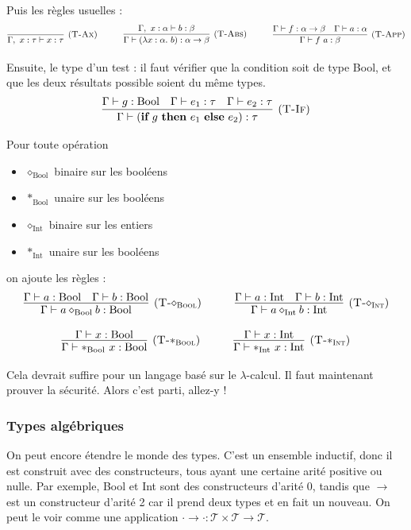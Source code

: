 \documentclass[11pt]{article}
\begin{document}
Puis les règles usuelles :
$$
\infer[(\text{\scshape{T-Ax}})] 
{\Gamma,~x:\tau\vdash x:\tau}{}
~~~~~~~~~
\infer[(\text{\scshape{T-Abs}})]
{\Gamma\vdash(\lambda x:\alpha.~b):\alpha\to\beta}
{\Gamma,~x:\alpha\vdash b:\beta}
~~~~~~~~~
\infer[(\text{\scshape{T-App}})]
{\Gamma \vdash f~a:\beta}
{\Gamma\vdash f:\alpha\to\beta & \Gamma\vdash a:\alpha}
$$

Ensuite, le type d'un test : il faut vérifier que la condition soit de type Bool, et que les deux résultats possible soient du même types.
$$
\infer[(\text{\scshape{T-If}})] 
{\Gamma \vdash (\textbf{if}~g~\textbf{then}~e_1~\textbf{else}~e_2):\tau}
{
    \Gamma \vdash g:\text{Bool}
    &
    \Gamma \vdash e_1:\tau
    &
    \Gamma \vdash e_2:\tau
}
$$

Pour toute opération
\begin{itemize}
    \item $\diamond_\text{Bool}$ binaire sur les booléens
    \item $\ast_\text{Bool}$ unaire sur les booléens
    \item $\diamond_\text{Int}$ binaire sur les entiers
    \item $\ast_\text{Int}$ unaire sur les booléens
\end{itemize}

on ajoute les règles :
$$
\infer[(\text{\scshape{T-$\diamond_\text{Bool}$}})] 
{\Gamma \vdash a \diamond_\text{Bool} b:\text{Bool}}
{
    \Gamma \vdash a:\text{Bool}&
    \Gamma \vdash b:\text{Bool}
}
~~~~~~~~~
\infer[(\text{\scshape{T-$\diamond_\text{Int}$}})] 
{\Gamma \vdash a \diamond_\text{Int} b:\text{Int}}
{
    \Gamma \vdash a:\text{Int}&
    \Gamma \vdash b:\text{Int}
}
$$

$$
\infer[(\text{\scshape{T-$\ast_\text{Bool}$}})] 
{\Gamma \vdash \ast_\text{Bool}~x:\text{Bool}}
{\Gamma \vdash x:\text{Bool}}
~~~~~~~~~
\infer[(\text{\scshape{T-$\ast_\text{Int}$}})] 
{\Gamma \vdash \ast_\text{Int}~x:\text{Int}}
{\Gamma \vdash x:\text{Int}}
$$

Cela devrait suffire pour un langage basé sur le $\lambda$-calcul. Il faut maintenant prouver la sécurité. Alors c'est parti, allez-y !

\subsubsection{Types algébriques}

On peut encore étendre le monde des types. C'est un ensemble inductif, donc il est construit avec des constructeurs, tous ayant une certaine arité positive ou nulle. Par exemple, Bool et Int sont des constructeurs d'arité 0, tandis que $\to$ est un constructeur d'arité 2 car il prend deux types et en fait un nouveau. On peut le voir comme une application $\cdot\to\cdot:\mathcal{T}\times\mathcal{T}\to\mathcal{T}$.
\end{document}
